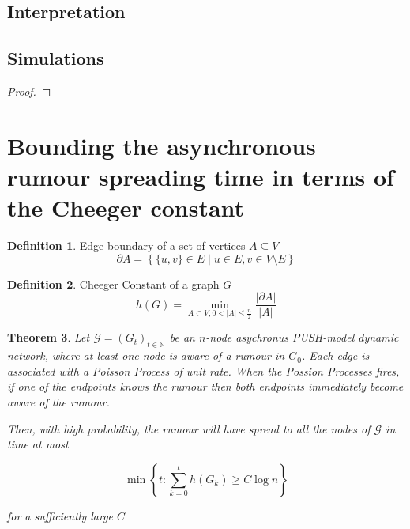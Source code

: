 \documentclass[a4paper,11pt]{article}
\newtheorem{theorem}{Theorem}[section]
\theoremstyle{definition}
\newtheorem{definition}[theorem]{Definition}
\begin{document}
\subsection{Interpretation}


\subsection{Simulations}



\begin{proof}
	
\end{proof}

\section{Bounding the asynchronous rumour spreading time in terms of the Cheeger constant}

\begin{definition}
	Edge-boundary of a set of vertices $A \subseteq V$
	$$
		\partial A = \left\{ \{u, v\} \in E \mid u \in E, v \in V \setminus E \right\} 
	$$
\end{definition}

\begin{definition}
	Cheeger Constant of a graph $G$
	$$
		h(G) = \min_{A \subset V, 0 < |A| \leq \frac{n}{2}} \frac{|\partial A|}{|A|}
	$$

\end{definition}

\begin{theorem}
	Let $\mathcal{G} = (G_t)_{t \in \mathbb{N}}$ be an $n$-node asychronus PUSH-model dynamic network, where at least one node is aware of a rumour in $G_0$. Each edge is associated with a Poisson Process of unit rate. When the Possion Processes fires, if one of the endpoints knows the rumour then both endpoints immediately become aware of the rumour. %

	Then, with high probability, the rumour will have spread to all the nodes of $\mathcal{G}$ in time at most

	$$
		\min \left\{t : \sum_{k=0}^t h(G_k) \geq C \log n \right\} 
	$$

	\noindent
	for a sufficiently large $C$
\end{theorem}
\end{document}
